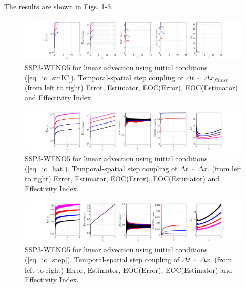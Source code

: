 \documentclass[12pt,a4paper]{article}
\numberwithin{equation}{section}
\theoremstyle{definition}
\begin{document}
The results are shown in Figs. \ref{fig_SSP3WENO_sinIC_plots_1x5_linadvect}-\ref{fig_SSP3WENO_stepIC_plots_1x5_linadvect}.
\begin{figure}[H]
	\hspace{-3cm}
	\includegraphics[scale=0.55]{../figures/fig_SSP3WENO_sinIC_plots_1x5_linadvect}	
	\caption{SSP3-WENO5 for linear advection using initial conditions (\ref{eq_ic_sinIC}).  Temporal-spatial step coupling of $\Delta t\sim \Delta x_{finest}$. (from left to right) Error, Estimator, EOC(Error), EOC(Estimator) and Effectivity Index.}
	\label{fig_SSP3WENO_sinIC_plots_1x5_linadvect}
\end{figure}
\begin{figure}[H]
	\hspace{-3cm}
	\includegraphics[scale=0.55]{../figures/fig_SSP3WENO_hatIC_plots_1x5_linadvect}	
	\caption{SSP3-WENO5 for linear advection using initial conditions (\ref{eq_ic_hat}).  Temporal-spatial step coupling of $\Delta t\sim \Delta x$. (from left to right) Error, Estimator, EOC(Error), EOC(Estimator) and Effectivity Index.}
	\label{fig_SSP3WENO_hatIC_plots_1x5_linadvect}
\end{figure}
\begin{figure}[H]
	\hspace{-3cm}
	\includegraphics[scale=0.55]{../figures/fig_SSP3WENO_stepIC_plots_1x5_linadvect}	
	\caption{SSP3-WENO5 for linear advection  using initial conditions (\ref{eq_ic_step}).  Temporal-spatial step coupling of $\Delta t\sim \Delta x$. (from left to right) Error, Estimator, EOC(Error), EOC(Estimator) and Effectivity Index.}
	\label{fig_SSP3WENO_stepIC_plots_1x5_linadvect}
\end{figure}
\end{document}
